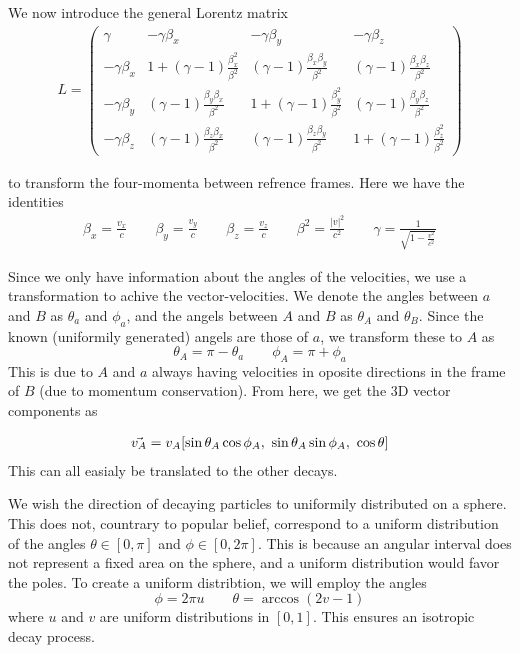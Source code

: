 \documentclass[12p,a4paper]{article}
\begin{document}
We now introduce the general Lorentz matrix 
\begin{align*}
    L = 
    \begin{pmatrix}
        \gamma     &-\gamma\beta_x   &-\gamma\beta_y  &-\gamma\beta_z \\
        -\gamma\beta_x  &1+(\gamma-1)\frac{\beta^2_x}{\beta^2}  &(\gamma-1)\frac{\beta_x\beta_y}{\beta^2}   &(\gamma-1)\frac{\beta_x\beta_z}{\beta^2}\\
        -\gamma\beta_y  &(\gamma-1)\frac{\beta_y\beta_x}{\beta^2}  &1+(\gamma-1)\frac{\beta_y^2}{\beta^2}   &(\gamma-1)\frac{\beta_y\beta_z}{\beta^2}\\
        -\gamma\beta_z  &(\gamma-1)\frac{\beta_z\beta_x}{\beta^2}  &(\gamma-1)\frac{\beta_z\beta_y}{\beta^2}   &1+(\gamma-1)\frac{\beta_z^2}{\beta^2} 
    \end{pmatrix}
\end{align*}

to transform the four-momenta between refrence frames. Here we have the identities
\begin{align*}
    \beta_x = \frac{v_x}{c} \quad\quad \beta_y = \frac{v_y}{c} \quad\quad \beta_z = \frac{v_z}{c} \quad\quad \beta^2 = \frac{|v|^2}{c^2} \quad\quad \gamma = \frac{1}{\sqrt{1-\frac{v^2}{c^2}}}
\end{align*}

Since we only have information about the angles of the velocities, we use a transformation to achive the vector-velocities. We denote the angles between $a$ and $B$ as $\theta_a$ and $\phi_a$, and the angels between $A$ and $B$ as $\theta_A$ and $\theta_B$. Since the known (uniformily generated) angels are those of $a$, we transform these to $A$ as
\[
    \theta_A = \pi - \theta_a \quad\quad \phi_A = \pi + \phi_a
\]
This is due to $A$ and $a$ always having velocities in oposite directions in the frame of $B$ (due to momentum conservation). From here, we get the 3D vector components as

\begin{align*}
    \vec{v_A} = v_A\qty[\sin{\theta_A}\cos{\phi_A},\ \sin{\theta_A}\sin{\phi_A},\ \cos{\theta}]
\end{align*}
This can all easialy be translated to the other decays.

We wish the direction of decaying particles to uniformily distributed on a sphere. This does not, countrary to popular belief, correspond to a uniform distribution of the angles $\theta\in [0,\pi]$ and $\phi \in [0,2\pi]$. This is because an angular interval does not represent a fixed area on the sphere, and a uniform distribution would favor the poles. To create a uniform distribtion, we will employ the angles
\[
    \phi = 2\pi u   \quad\quad   \theta = \arccos(2v - 1)
\]
where $u$ and $v$ are uniform distributions in $[0, 1]$. This ensures an isotropic decay process.
\end{document}

